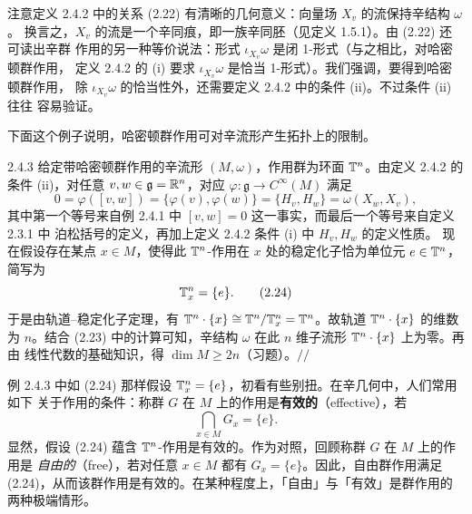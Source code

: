 注意定义 2.4.2 中的关系 (2.22) 有清晰的几何意义：向量场 $X_v$ 的流保持辛结构 $\omega$。
换言之，$X_v$ 的流是一个辛同痕，即一族辛同胚（见定义 1.5.1）。由 (2.22) 还可读出辛群
作用的另一种等价说法：形式 $\iota_{X_v}\omega$ 是闭 1-形式（与之相比，对哈密顿群作用，
定义 2.4.2 的 (i) 要求 $\iota_{X_v}\omega$ 是恰当 1-形式）。我们强调，要得到哈密顿群作用，
除 $\iota_{X_v}\omega$ 的恰当性外，还需要定义 2.4.2 中的条件 (ii)。不过条件 (ii) 往往
容易验证。

下面这个例子说明，哈密顿群作用可对辛流形产生拓扑上的限制。

\begin{wexam}{2.4.3}
给定带哈密顿群作用的辛流形 $(M,\omega)$，作用群为环面 $\mathbb{T}^n$。由定义 2.4.2 的条件
(ii)，对任意 $v,w\in\mathfrak{g}=\mathbb{R}^n$，对应 $\varphi:\mathfrak{g}\to C^\infty(M)$
满足
\begin{equation}
  0=\varphi([v,w])=\{\varphi(v),\varphi(w)\}=\{H_v,H_w\}=\omega(X_w,X_v),
  \tag{2.23}
\end{equation}
其中第一个等号来自例 2.4.1 中 $[v,w]=0$ 这一事实，而最后一个等号来自定义 2.3.1 中
泊松括号的定义，再加上定义 2.4.2 条件 (i) 中 $H_v,H_w$ 的定义性质。
现在假设存在某点 $x\in M$，使得此 $\mathbb{T}^n$-作用在 $x$ 处的稳定化子恰为单位元
$e\in\mathbb{T}^n$，简写为
\begin{equation}
  \mathbb{T}^n_x=\{e\}.
  \tag{2.24}
\end{equation}
于是由轨道–稳定化子定理，有
$\mathbb{T}^n\cdot\{x\}\cong\mathbb{T}^n/\mathbb{T}^n_x=\mathbb{T}^n$。故轨道 $\mathbb{T}^n\cdot\{x\}$ 的维数为 $n$。结合
(2.23) 中的计算可知，辛结构 $\omega$ 在此 $n$ 维子流形 $\mathbb{T}^n\cdot\{x\}$ 上为零。再由
线性代数的基础知识，得 $\dim M\ge2n$（习题）。\hfill$//$
\end{wexam}

例 2.4.3 中如 (2.24) 那样假设 $\mathbb{T}^n_x=\{e\}$，初看有些别扭。在辛几何中，人们常用如下
关于作用的条件：称群 $G$ 在 $M$ 上的作用是\textbf{有效的}（effective），若
\[
  \bigcap_{x\in M}G_x=\{e\}.
\]
显然，假设 (2.24) 蕴含 $\mathbb{T}^n$-作用是有效的。作为对照，回顾称群 $G$ 在 $M$ 上的作用是
\emph{自由的}（free），若对任意 $x\in M$ 都有 $G_x=\{e\}$。因此，自由群作用满足
(2.24)，从而该群作用是有效的。在某种程度上，「自由」与「有效」是群作用的两种极端情形。

